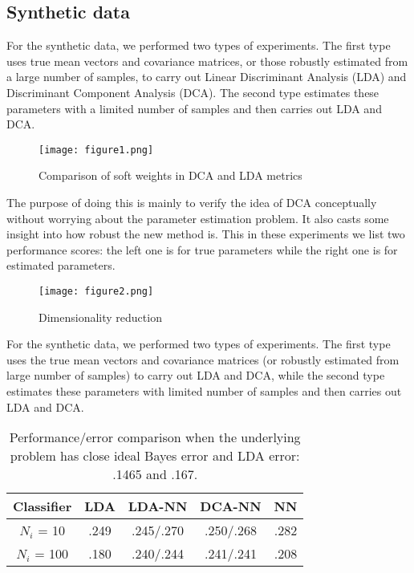\documentclass[12pt]{article}
\begin{document}
\subsection{Synthetic data}
\hspace{10pt}
For the synthetic data, we performed two types of experiments. The first type uses true mean vectors and covariance matrices, or those robustly estimated from a large number of samples, to carry out Linear Discriminant Analysis (LDA) and Discriminant Component Analysis (DCA). The second type estimates these parameters with a limited number of samples and then carries out LDA and DCA.

\newpage

\begin{figure}[h]
    \centering
    \texttt{[image: figure1.png]}
    \caption{Comparison of soft weights in DCA and LDA metrics}
    \label{fig:1}
\end{figure}

The purpose of doing this is mainly to verify the idea of DCA conceptually without worrying about the parameter estimation problem. It also casts some insight into how robust the new method is. This in these experiments we list two performance scores: the left one is for true parameters while the right one is for estimated parameters.

\newpage

\begin{figure}[h]
    \centering
    \texttt{[image: figure2.png]}
    \caption{Dimensionality reduction}
    \label{fig:2}
\end{figure}

For the synthetic data, we performed two types of experiments. The first type uses the true mean vectors and covariance matrices (or robustly estimated from large number of samples) to carry out LDA and DCA, while the second type estimates these parameters with limited number of samples and then carries out LDA and DCA.

\begin{table}[h]
\caption{Performance/error comparison when the underlying problem has close ideal Bayes error and LDA error: .1465 and .167.}
\label{tab:m1}
\vspace{10pt}
\centering
\begin{tabular}{|c|c|c|c|c|}
\hline
Classifier & LDA & LDA-NN & DCA-NN & NN \\
\hline
$N_i$ = 10 & .249 & .245/.270 & .250/.268 & .282 \\
\hline
$N_i$ = 100 & .180 & .240/.244 & .241/.241 & .208 \\
\hline
\end{tabular}
\end{table}
\end{document}
